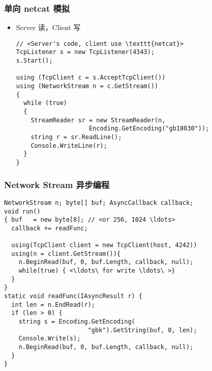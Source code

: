 \begin{frame}[fragile]
\frametitle{单向 netcat 模拟}
\begin{itemize}
\item Server 读，Client 写
\begin{lstlisting}[escapeinside=<>]
// <Server's code, client use \texttt{netcat}>
TcpListener s = new TcpListener(4343);
s.Start();

using (TcpClient c = s.AcceptTcpClient())
using (NetworkStream n = c.GetStream())
{
  while (true)
  {
    StreamReader sr = new StreamReader(n, 
                    Encoding.GetEncoding("gb18030"));
    string r = sr.ReadLine();
    Console.WriteLine(r);
  }
}
\end{lstlisting}
\end{itemize}
\end{frame}






\begin{frame}[fragile]
\frametitle{Network Stream 异步编程}
\begin{lstlisting}[escapeinside=<>]
NetworkStream n; byte[] buf; AsyncCallback callback;
void run()
{ buf   = new byte[8]; // <or 256, 1024 \ldots>
  callback += readFunc; 

  using(TcpClient client = new TcpClient(host, 4242))
  using(n = client.GetStream()){
    n.BeginRead(buf, 0, buf.Length, callback, null);
    while(true) { <\ldots\ for write \ldots\ >}
  }
}
static void readFunc(IAsyncResult r) {
  int len = n.EndRead(r);
  if (len > 0) {
    string s = Encoding.GetEncoding(
                       "gbk").GetString(buf, 0, len);
    Console.Write(s);
    n.BeginRead(buf, 0, buf.Length, callback, null);
  }
}
\end{lstlisting}
\end{frame}


